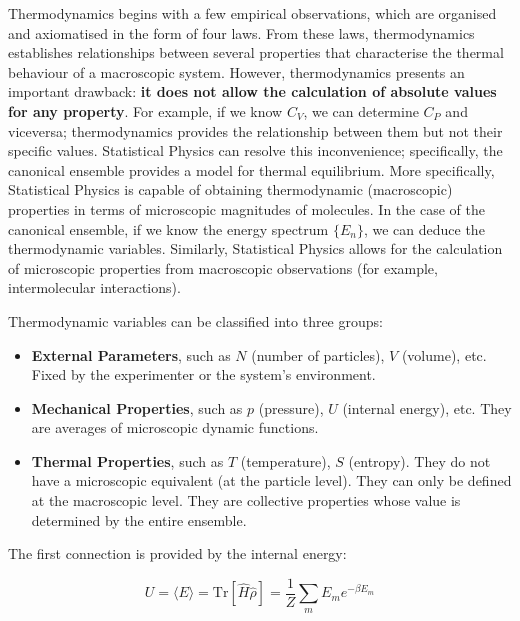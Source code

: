 \documentclass[12pt,a4paper]{report}
\newcommand{\esp}{\vspace{0.5cm}}
\begin{document}
\esp

Thermodynamics begins with a few empirical observations, which are organised and axiomatised in the form of four laws. From these laws, thermodynamics establishes relationships between several properties that characterise the thermal behaviour of a macroscopic system. However, thermodynamics presents an important drawback: \textbf{it does not allow the calculation of absolute values for any property}. For example, if we know $C_V$, we can determine $C_P$ and viceversa; thermodynamics provides the relationship between them but not their specific values. Statistical Physics can resolve this inconvenience; specifically, the canonical ensemble provides a model for thermal equilibrium. More specifically, Statistical Physics is capable of obtaining thermodynamic (macroscopic) properties in terms of microscopic magnitudes of molecules. In the case of the canonical ensemble, if we know the energy spectrum $\{E_n\}$, we can deduce the thermodynamic variables. Similarly, Statistical Physics allows for the calculation of microscopic properties from macroscopic observations (for example, intermolecular interactions).

\esp

Thermodynamic variables can be classified into three groups:

\esp

\begin{itemize}
	\item \textbf{External Parameters}, such as $N$ (number of particles), $V$ (volume), etc. Fixed by the experimenter or the system's environment.
	\item \textbf{Mechanical Properties}, such as $p$ (pressure), $U$ (internal energy), etc. They are averages of microscopic dynamic functions.
	\item \textbf{Thermal Properties}, such as $T$ (temperature), $S$ (entropy). They do not have a microscopic equivalent (at the particle level). They can only be defined at the macroscopic level. They are collective properties whose value is determined by the entire ensemble.
\end{itemize}

\esp

The first connection is provided by the internal energy:

\esp

\begin{equation}
	U = \langle E \rangle = \text{Tr}[\hat{H}\hat{\rho}] = \frac{1}{Z} \sum_{m} E_m e^{-\beta E_m} \tag{5.23}
\end{equation}
\end{document}
